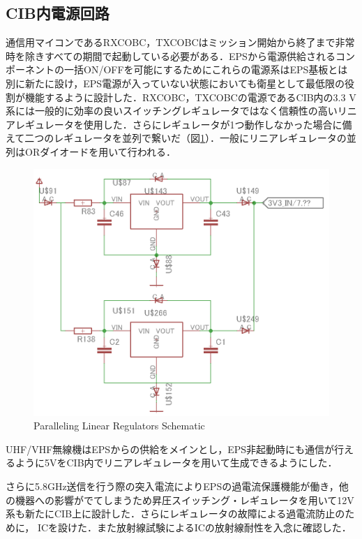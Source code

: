 \subsection{CIB内電源回路}



通信用マイコンであるRXCOBC，TXCOBCはミッション開始から終了まで非常時を除きすべての期間で起動している必要がある．EPSから電源供給されるコンポーネントの一括ON/OFFを可能にするためにこれらの電源系はEPS基板とは別に新たに設け，EPS電源が入っていない状態においても衛星として最低限の役割が機能するように設計した．RXCOBC，TXCOBCの電源であるCIB内の3.3 V系には一般的に効率の良いスイッチングレギュレータではなく信頼性の高いリニアレギュレータを使用した．さらにレギュレータが1つ動作しなかった場合に備えて二つのレギュレータを並列で繋いだ（図\ref{fig3_1_3V3}）．一般にリニアレギュレータの並列はORダイオードを用いて行われる\cite{reg_um}．

\begin{figure}[htbp]
	\begin{center}
		\includegraphics[width=0.6\linewidth]{./03/fig/3V3.png}
		\caption{Paralleling Linear Regulators Schematic}
		\label{fig3_1_3V3}
	\end{center}
\end{figure}

UHF/VHF無線機はEPSからの供給をメインとし，EPS非起動時にも通信が行えるように5VをCIB内でリニアレギュレータを用いて生成できるようにした．

さらに5.8GHz送信を行う際の突入電流によりEPSの過電流保護機能が働き，他の機器への影響がでてしまうため昇圧スイッチング・レギュレータを用いて12V系も新たにCIB上に設計した．さらにレギュレータの故障による過電流防止のために，
ICを設けた．また放射線試験によるICの放射線耐性を入念に確認した．

